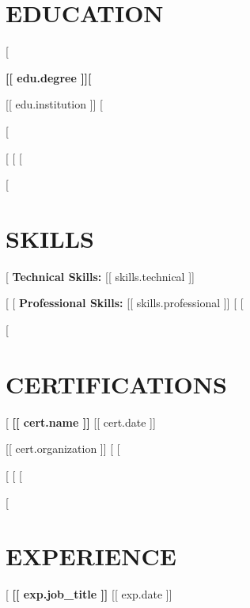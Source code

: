 \documentclass[a4paper,10pt]{article}
\begin{document}
\section{EDUCATION}
[%
{\large\bfseries [[ edu.degree ]][%

{\normalsize [[ edu.institution ]]}
[%

\vspace{2pt}
{\small
[%
}

[%
[%
[%

[%
\section{SKILLS}
[%
{\bfseries Technical Skills:} [[ skills.technical ]]

[%
[%
{\bfseries Professional Skills:} [[ skills.professional ]]
[%
[%

[%
\section{CERTIFICATIONS}
[%
{\large\bfseries [[ cert.name ]]} \hfill {\large [[ cert.date ]]}

{\normalsize [[ cert.organization ]]}
[%
[%

[%
[%
[%

[%
\section{EXPERIENCE}
[%
{\large\bfseries [[ exp.job_title ]]} \hfill {\large [[ exp.date ]]}

}
\end{document}

